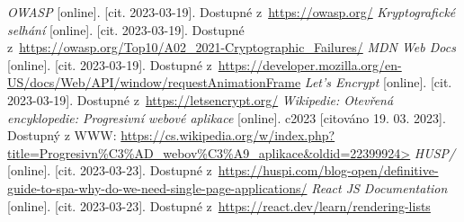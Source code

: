 \begin{thebibliography}{99}
     \textit{OWASP} [online]. [cit. 2023-03-19]. Dostupné z~\url{https://owasp.org/}
     \textit{Kryptografické selhání} [online]. [cit. 2023-03-19]. Dostupné z~\url{https://owasp.org/Top10/A02_2021-Cryptographic_Failures/}
     \textit{MDN Web Docs} [online]. [cit. 2023-03-19]. Dostupné z~\url{https://developer.mozilla.org/en-US/docs/Web/API/window/requestAnimationFrame}
     \textit{Let's Encrypt} [online]. [cit. 2023-03-19]. Dostupné z~\url{https://letsencrypt.org/}
     \textit{Wikipedie: Otevřená encyklopedie: Progresivní webové aplikace} [online]. c2023 [citováno 19. 03. 2023]. Dostupný z WWW: \url{https://cs.wikipedia.org/w/index.php?title=Progresivn%C3%AD_webov%C3%A9_aplikace&oldid=22399924>}
     \textit{HUSP/} [online]. [cit. 2023-03-23]. Dostupné z~\url{https://huspi.com/blog-open/definitive-guide-to-spa-why-do-we-need-single-page-applications/}
     \textit{React JS Documentation} [online]. [cit. 2023-03-23]. Dostupné z~\url{https://react.dev/learn/rendering-lists}
\end{thebibliography}